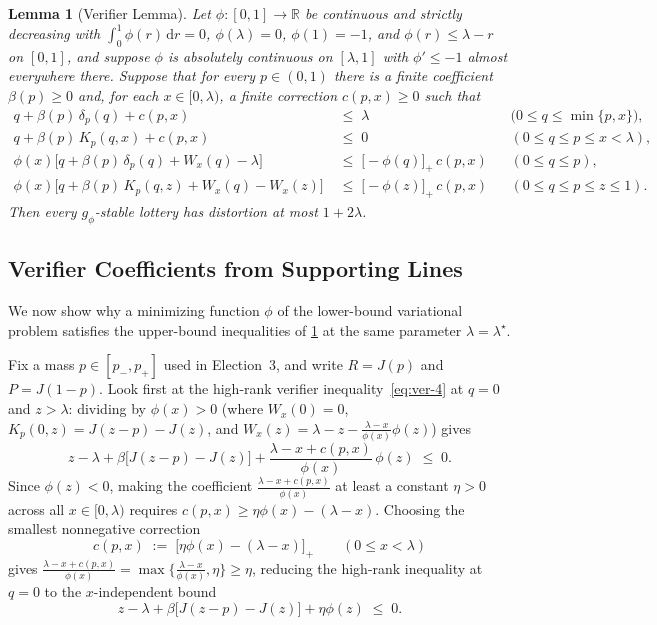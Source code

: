 \documentclass[11pt]{article}
\numberwithin{equation}{section}
\theoremstyle{plain}
\newtheorem{lemma}[theorem]{Lemma}
\theoremstyle{definition}
\newcommand{\R}{\mathbb{R}}
\newcommand{\1}{\mathbf{1}}
\begin{document}
\begin{lemma}[Verifier Lemma]
\label{lem:verifier}
Let $\phi \colon [0, 1] \to \R$ be continuous and strictly decreasing with $\int_0^1 \phi(r)\,\mathrm{d}r = 0$, $\phi(\lambda) = 0$, $\phi(1) = -1$, and $\phi(r) \le \lambda - r$ on $[0, 1]$, and suppose $\phi$ is absolutely continuous on $[\lambda, 1]$ with $\phi' \le -1$ almost everywhere there. Suppose that for every $p \in (0, 1)$ there is a finite coefficient $\beta(p) \ge 0$ and, for each $x \in [0, \lambda)$, a finite correction $c(p, x) \ge 0$ such that
\begin{align}
  q + \beta(p)\,\delta_p(q) + c(p, x) &\;\le\; \lambda
    && \bigl(0 \le q \le \min\{p, x\}\bigr), \label{eq:ver-1} \\
  q + \beta(p)\,K_p(q, x) + c(p, x) &\;\le\; 0
    && (0 \le q \le p \le x < \lambda), \label{eq:ver-2} \\
  \phi(x)\bigl[q + \beta(p)\,\delta_p(q) + W_x(q) - \lambda\bigr] &\;\le\; \bigl[-\phi(q)\bigr]_+\,c(p, x)
    && (0 \le q \le p), \label{eq:ver-3} \\
  \phi(x)\bigl[q + \beta(p)\,K_p(q, z) + W_x(q) - W_x(z)\bigr] &\;\le\; \bigl[-\phi(z)\bigr]_+\,c(p, x)
    && (0 \le q \le p \le z \le 1). \label{eq:ver-4}
\end{align}
Then every $g_\phi$-stable lottery has distortion at most $1 + 2\lambda$.
\end{lemma}

\subsection{Verifier Coefficients from Supporting Lines}
\label{sec:duality-coefficients}

We now show why a minimizing function $\phi$ of the lower-bound variational problem satisfies the upper-bound inequalities of \cref{lem:verifier} at the same parameter $\lambda = \lambda^\star$.

Fix a mass $p \in [p_-, p_+]$ used in Election~3, and write $R = J(p)$ and $P = J(1 - p)$. Look first at the high-rank verifier inequality~\eqref{eq:ver-4} at $q = 0$ and $z > \lambda$: dividing by $\phi(x) > 0$ (where $W_x(0) = 0$, $K_p(0, z) = J(z - p) - J(z)$, and $W_x(z) = \lambda - z - \frac{\lambda - x}{\phi(x)}\phi(z)$) gives
\[
  z - \lambda + \beta\bigl[J(z - p) - J(z)\bigr] + \frac{\lambda - x + c(p, x)}{\phi(x)}\,\phi(z) \;\le\; 0.
\]
Since $\phi(z) < 0$, making the coefficient $\frac{\lambda - x + c(p, x)}{\phi(x)}$ at least a constant $\eta > 0$ across all $x \in [0, \lambda)$ requires $c(p, x) \ge \eta\phi(x) - (\lambda - x)$. Choosing the smallest nonnegative correction
\[
  c(p, x) \;:=\; \bigl[\eta\phi(x) - (\lambda - x)\bigr]_+
  \qquad (0 \le x < \lambda)
\]
gives $\frac{\lambda - x + c(p, x)}{\phi(x)} = \max\bigl\{\frac{\lambda - x}{\phi(x)}, \eta\bigr\} \ge \eta$, reducing the high-rank inequality at $q = 0$ to the $x$-independent bound
\begin{equation}
  z - \lambda + \beta\bigl[J(z - p) - J(z)\bigr] + \eta\phi(z) \;\le\; 0.
  \label{eq:high-q0-target}
\end{equation}
\end{document}

